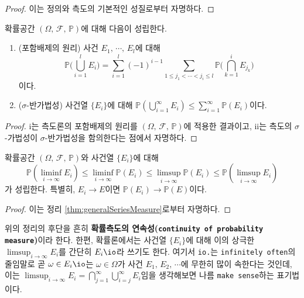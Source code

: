 \begin{proof}
    이는 정의와 측도의 기본적인 성질로부터 자명하다.
\end{proof}

\begin{theorem}
    확률공간 $(\Omega,\,\mathcal{F},\,\mathbb{P})$에 대해 다음이 성립한다.
    \begin{enumerate}
        \item (포함배제의 원리) 사건 $E_1,\,\cdots,\,E_l$에 대해
        \begin{equation*}
            \mathbb{P}\bigg(\bigcup_{i=1}^lE_i\bigg)=\sum_{i=1}^l(-1)^{i-1}\sum_{1\leq j_1<\cdots<j_i\leq l}\mathbb{P}\bigg(\bigcap_{k=1}^i E_{j_k}\bigg)
        \end{equation*}
        이다.
        \item ($\sigma$-반가법성) 사건열 $\{E_i\}$에 대해 $\mathbb{P}(\bigcup_{i=1}^\infty E_i)\leq\sum_{i=1}^\infty\mathbb{P}(E_i)$이다.
    \end{enumerate}
\end{theorem}

\begin{proof}
    i는 측도론의 포함배제의 원리를 $(\Omega,\,\mathcal{F},\,\mathbb{P})$에 적용한 결과이고, ii는 측도의 $\sigma$-가법성이 $\sigma$-반가법성을 함의한다는 점에서 자명하다.
\end{proof}

\begin{theorem}
    확률공간 $(\Omega,\,\mathcal{F},\,\mathbb{P})$와 사건열 $\{E_i\}$에 대해 
    \begin{equation*}
        \mathbb{P}(\liminf_{i\to\infty}E_i)\leq\liminf_{i\to\infty}\mathbb{P}(E_i)\leq\limsup_{i\to\infty}\mathbb{P}(E_i)\leq\mathbb{P}(\limsup_{i\to\infty}E_i)
    \end{equation*}
    가 성립한다. 특별히, $E_i\to E$이면 $\mathbb{P}(E_i)\to\mathbb{P}(E)$이다.
\end{theorem}

\begin{proof}
    이는 정리 \ref{thm:generalSeriesMeasure}로부터 자명하다.
\end{proof}

위의 정리의 후단을 흔히 \textbf{확률측도의 연속성(\texttt{continuity of probability measure})}이라 한다. 한편, 확률론에서는 사건열 $\{E_i\}$에 대해 이의 상극한 $\limsup_{i\to\infty}E_i$를 간단히 $E_i\io$라 쓰기도 한다. 여기서 \texttt{io.}는 \texttt{infinitely often}의 줄임말로 곧 $\omega\in E_i\io$는 $\omega\in\Omega$가 사건 $E_1,\,E_2,\,\cdots$에 무한히 많이 속한다는 것인데, 이는 $\limsup_{i\to\infty}E_i=\bigcap_{j=1}^\infty\bigcup_{i=j}^\infty E_i$임을 생각해보면 나름 \texttt{make sense}하는 표기법이다.

